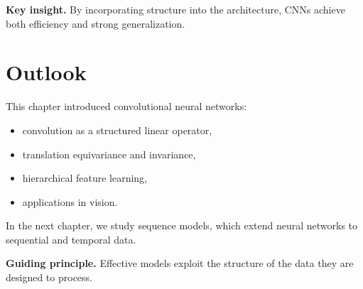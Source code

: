 \medskip

\noindent
\textbf{Key insight.}  
By incorporating structure into the architecture, CNNs achieve both efficiency and strong generalization.

\section{Outlook}

This chapter introduced convolutional neural networks:
\begin{itemize}
    \item convolution as a structured linear operator,
    \item translation equivariance and invariance,
    \item hierarchical feature learning,
    \item applications in vision.
\end{itemize}

\medskip

In the next chapter, we study sequence models, which extend neural networks to sequential and temporal data.

\medskip

\noindent
\textbf{Guiding principle.}  
Effective models exploit the structure of the data they are designed to process.